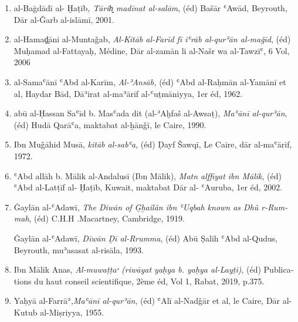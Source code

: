 \documentclass[a4paper,12pt]{report}
\begin{document}
\begin{french}
\begin{enumerate} [III]
\begin{enumerate}
\item al-Baġdādī al- Ḫaṭīb\textit{, Tārih̬ madīnat al-salām},  (éd) Bašār ʿAwād, Beyrouth, Dār al-Ǧarb al-islāmī, 2001.


\item  al-Hamaḏ̠āni al-Muntaǧab,\textit{ Al-Kitāb al-Farīd fī iʿrāb  al-qurʾān al-maǧīd}, (éd) Muḥamad al-Fattayaḥ, Médine, Dār al-zamān li al-Našr wa al-Tawzīʿ, 6 Vol,  2006



\item  al-Samaʿānī ʿAbd al-Karīm, \textit{Al-ʾAnsāb,} (éd) ʿAbd al-Raḥmān al-Yamānī et al, Haydar Bād, Dāʾirat al-maʾārif al-ʿuṯmāniyya, 1er éd, 1962. 

\item abū al-Ḥassan  Saʿīd b. Masʿada   dit (al-ʾAḫfaš al-Awsaṭ), \textit{Maʿānī al-qurʾān}, (éd) Hudā Qarāʿa, maktabat al-ḫānǧī, le Caire, 1990.

\item Ibn Muǧāhid Musā, \textit{kitāb al-sabʿa}, (éd) Ḍayf Šawq\=i, Le Caire, dār al-maʿārif, 1972.


\item ʿAbd allāh b. Mālik al-Andalusī (Ibn Mālik), \textit{Matn alffiyat ibn Mālik},  (éd) ʿAbd al-Latṭīf al- Ḫaṭīb,  Kuwait, maktabat Dār al- ʿAuruba, 1er éd, 2002.


\item Ġaylān  al-ʿAdawī, \textit{The Diwān of G̲h̲ailân ibn ʿUqbah known as Dhû r-Rummah}, (éd) C.H.H .Macartney,  Cambridge, 1919. 

    
\textemdash\textemdash  Ġaylān al-ʿAdawī, \textit{Dīwān Ḏī al-Rrumma}, (éd) Ab\=u Ṣalih ʿAbd al-Qudus, Beyrouth, muʾasasat al-risāla, 1993.

\item  Ibn Mālik Anas, \textit { Al-muwaṭṭaᵓ (riwāyat yaḥya b. yaḥya al-Layṯi)}, (éd) Publications du haut conseil scientifique, 2ème éd, Vol 1,  Rabat, 2019, p.375.



\item 
Yaḥyā al-Farrāʾ\textit{,Maʿānī al-qurʾān}, (éd) ʿAlī al-Nadǧār et al,  le Caire, Dār al-Kutub al-Miṣriyya, 1955. 



    \end{enumerate} 
    
  
    
    
    

\end{enumerate}
\end{french}
\end{document}
